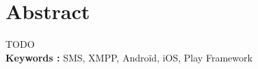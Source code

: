 \cleardoublepage



\chapter*{Abstract}

\thispagestyle{empty}



TODO
\\



\textbf{Keywords : }
SMS, XMPP, Androïd, iOS, Play Framework